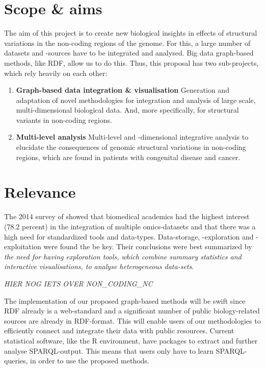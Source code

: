 \documentclass[twoside,fontsize=12pt]{article}
\begin{document}
\section*{Scope \& aims}
The aim of this project is to create new biological insights in effects of structural variations in the non-coding regions of the genome. For this, a large number of datasets and -sources have to be integrated and analysed. Big data graph-based methods, like RDF,  allow us to do this.
Thus, this proposal has two sub-projects, which rely heavily on each other:

\begin{enumerate}
\item \textbf{Graph-based data integration \& visualisation} 
Generation and adaptation of novel methodologies for integration and analysis of large scale, multi-dimensional biological data. And, more specifically, for structural variants in non-coding regions.
\item \textbf{Multi-level analysis} 
Multi-level and -dimensional integrative analysis to elucidate the consequences of genomic structural variations in non-coding regions, which are found in patients with congenital disease and cancer. 
\end{enumerate}
\section*{Relevance}
The 2014 survey of \citet{Gomez-Cabrero2014} showed that biomedical academics had the highest interest (78.2 percent) in the integration of multiple omics-datasets and that there was a high need for standardized tools and data-types. Data-storage, -exploration and -exploitation were found the be key. Their conclusions were best summarized by \textit{the need for having exploration tools, which combine summary statistics and interactive visualisations, to analyse heterogeneous data-sets}.
\medskip

\noindent
\emph{ \color{red}HIER NOG IETS OVER NON\_CODING\_NC }
\medskip

\noindent
The implementation of our proposed graph-based methods will be swift since RDF already is a web-standard and a significant number of public biology-related sources are already in RDF-format. This will enable users of our methodologies to efficiently connect and integrate their data with public resources. Current statistical software, like the R environment, have packages to extract and further analyse SPARQL-output. This means that users only have to learn SPARQL-queries, in order to use the proposed methods.
\end{document}
